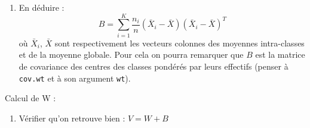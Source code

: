 \documentclass[
]{article}
\newenvironment{Shaded}{\begin{snugshade}}{\end{snugshade}}
\newcommand{\CommentTok}[1]{\textcolor[rgb]{0.56,0.35,0.01}{\textit{#1}}}
\newcommand{\ControlFlowTok}[1]{\textcolor[rgb]{0.13,0.29,0.53}{\textbf{#1}}}
\newcommand{\DataTypeTok}[1]{\textcolor[rgb]{0.13,0.29,0.53}{#1}}
\newcommand{\DecValTok}[1]{\textcolor[rgb]{0.00,0.00,0.81}{#1}}
\newcommand{\KeywordTok}[1]{\textcolor[rgb]{0.13,0.29,0.53}{\textbf{#1}}}
\newcommand{\NormalTok}[1]{#1}
\newcommand{\OperatorTok}[1]{\textcolor[rgb]{0.81,0.36,0.00}{\textbf{#1}}}
\newcommand{\StringTok}[1]{\textcolor[rgb]{0.31,0.60,0.02}{#1}}
\providecommand{\tightlist}{%
  \setlength{\itemsep}{0pt}\setlength{\parskip}{0pt}}
\begin{document}
\begin{enumerate}
\def\labelenumi{\arabic{enumi}.}
\setcounter{enumi}{15}
\tightlist
\item
  En déduire : \[
  B = \sum_{i=1}^{K}\frac{n_i}{n}(\bar{X}_{i}-\bar{X})(\bar{X}_{i}-\bar{X})^T
  \] où \(\bar{X}_{i}\), \(\bar{X}\) sont respectivement les vecteurs
  colonnes des moyennes intra-classes et de la moyenne globale. Pour
  cela on pourra remarquer que \(B\) est la matrice de covariance des
  centres des classes pondérés par leurs effectifs (penser à
  \texttt{cov.wt} et à son argument \texttt{wt}).
\end{enumerate}

\begin{Shaded}
\end{Shaded}

Calcul de W :

\begin{Shaded}
\end{Shaded}

\begin{enumerate}
\def\labelenumi{\arabic{enumi}.}
\setcounter{enumi}{16}
\tightlist
\item
  Vérifier qu'on retrouve bien : \(V = W + B\)
\end{enumerate}
\end{document}
